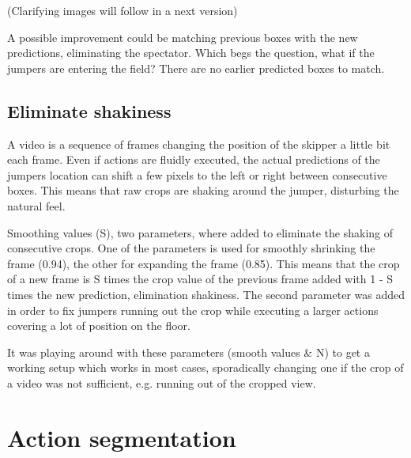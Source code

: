 (Clarifying images will follow in a next version)

A possible improvement could be matching previous boxes with the new predictions, eliminating the spectator. Which begs the question, what if the jumpers are entering the field? There are no earlier predicted boxes to match.

\subsection{Eliminate shakiness}

A video is a sequence of frames changing the position of the skipper a little bit each frame. Even if actions are fluidly executed, the actual predictions of the jumpers location can shift a few pixels to the left or right between consecutive boxes. This means that raw crops are shaking around the jumper, disturbing the natural feel.

Smoothing values (S), two parameters, where added to eliminate the shaking of consecutive crops. One of the parameters is used for smoothly shrinking the frame (0.94), the other for expanding the frame (0.85).
This means that the crop of a new frame is S times the crop value of the previous frame added with 1 - S times the new prediction, elimination shakiness. The second parameter was added in order to fix jumpers running out the crop while executing a larger actions covering a lot of position on the floor.

It was playing around with these parameters (smooth values \& N) to get a working setup which works in most cases, sporadically changing one if the crop of a video was not sufficient, e.g. running out of the cropped view.





\section{Action segmentation}

